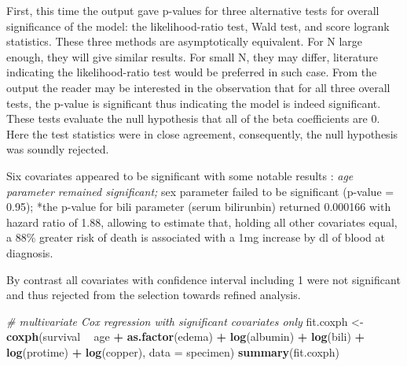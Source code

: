 \documentclass[]{article}
\newenvironment{Shaded}{\begin{snugshade}}{\end{snugshade}}
\newcommand{\KeywordTok}[1]{\textcolor[rgb]{0.13,0.29,0.53}{\textbf{#1}}}
\newcommand{\DataTypeTok}[1]{\textcolor[rgb]{0.13,0.29,0.53}{#1}}
\newcommand{\StringTok}[1]{\textcolor[rgb]{0.31,0.60,0.02}{#1}}
\newcommand{\CommentTok}[1]{\textcolor[rgb]{0.56,0.35,0.01}{\textit{#1}}}
\newcommand{\OperatorTok}[1]{\textcolor[rgb]{0.81,0.36,0.00}{\textbf{#1}}}
\newcommand{\NormalTok}[1]{#1}
\begin{document}
First, this time the output gave p-values for three alternative tests
for overall significance of the model: the likelihood-ratio test, Wald
test, and score logrank statistics. These three methods are
asymptotically equivalent. For N large enough, they will give similar
results. For small N, they may differ, literature indicating the
likelihood-ratio test would be preferred in such case. From the output
the reader may be interested in the observation that for all three
overall tests, the p-value is significant thus indicating the model is
indeed significant. These tests evaluate the null hypothesis that all of
the beta coefficients are 0. Here the test statistics were in close
agreement, consequently, the null hypothesis was soundly rejected.

Six covariates appeared to be significant with some notable results :
\emph{age parameter remained significant; }sex parameter failed to be
significant (p-value = 0.95); *the p-value for bili parameter (serum
bilirunbin) returned 0.000166 with hazard ratio of 1.88, allowing to
estimate that, holding all other covariates equal, a 88\% greater risk
of death is associated with a 1mg increase by dl of blood at diagnosis.

By contrast all covariates with confidence interval including 1 were not
significant and thus rejected from the selection towards refined
analysis.

\begin{Shaded}
\begin{Highlighting}[]
\CommentTok{# multivariate Cox regression with significant covariates only}
\NormalTok{fit.coxph <-}\StringTok{ }\KeywordTok{coxph}\NormalTok{(survival  }\OperatorTok{~}\StringTok{ }\NormalTok{age }\OperatorTok{+}\StringTok{ }\KeywordTok{as.factor}\NormalTok{(edema) }\OperatorTok{+}\StringTok{ }\KeywordTok{log}\NormalTok{(albumin) }\OperatorTok{+}\StringTok{ }\KeywordTok{log}\NormalTok{(bili) }\OperatorTok{+}\StringTok{ }\KeywordTok{log}\NormalTok{(protime) }\OperatorTok{+}\StringTok{ }\KeywordTok{log}\NormalTok{(copper), }\DataTypeTok{data =}\NormalTok{ specimen)}
\KeywordTok{summary}\NormalTok{(fit.coxph)}
\end{Highlighting}
\end{Shaded}
\end{document}
